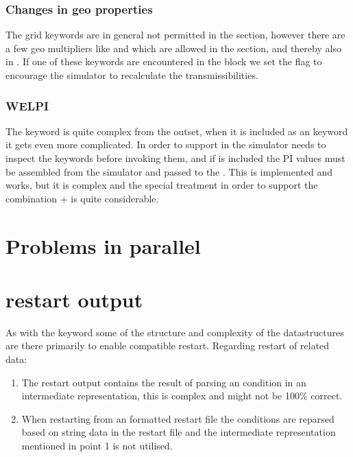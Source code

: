 \subsubsection{Changes in geo properties}
The grid keywords are in general not permitted in the  section,
however there are a few geo multipliers like  and  which
are allowed in the  section, and thereby also in \actionx{}. If one
of these keywords are encountered in the \actionx{} block we set the flag
 to encourage the
simulator to recalculate the transmissibilities.


\subsubsection{WELPI}
\label{actionx_welpi}
The  keyword is quite complex from the outset, when it is included as
an \actionx{} keyword it gets even more complicated. In order to support
 in \actionx{} the simulator needs to inspect the \actionx{} keywords
before invoking them, and if  is included the PI values must be
assembled from the simulator and passed to the
. This is implemented and works, but it is
complex and the special treatment in order to support the combination 
+ \actionx{} is quite considerable.


\section{Problems in parallel}

\section{\actionx{} restart output}
As with the \udq{} keyword some of the structure and complexity of the
\actionx{} datastructures are there primarily to enable \eclipse{} compatible
restart. Regarding restart of \actionx{} related data:
\begin{enumerate}
  \item The restart output contains the result of parsing an \actionx{}
    condition in an intermediate representation, this is complex and might not
    be 100\% correct.
  \item When restarting \flow{} from an \eclipse{} formatted restart file the
    \actionx{} conditions are reparsed based on string data in the restart file
    and the intermediate representation mentioned in point 1 is not utilised.
\end{enumerate}
